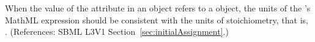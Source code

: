 When the value of the attribute  in an \InitialAssignment
object refers to a \SpeciesReference object, the units of the
\InitialAssignment's MathML  expression should be consistent
with the units of stoichiometry, that is, .
(References: SBML L3V1 Section~\ref{sec:initialAssignment}.)

